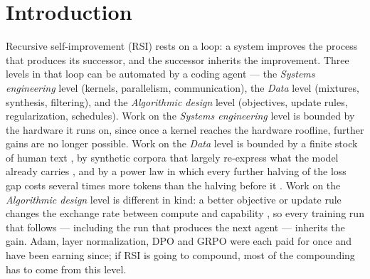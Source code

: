 \section{Introduction}
\label{sec:intro}

Recursive self-improvement (RSI) rests on a loop: a system improves the process that produces its successor, and the successor inherits the improvement. 
Three levels in that loop can be automated by a coding agent --- the \emph{Systems engineering} level (kernels, parallelism, communication), the \emph{Data} level (mixtures, synthesis, filtering), and the \emph{Algorithmic design} level (objectives, update rules, regularization,
schedules). 
Work on the \emph{Systems engineering} level is bounded by the hardware it runs on, since once a kernel reaches the hardware roofline, further gains are no longer possible.
Work on the \emph{Data} level is bounded by a finite stock of human text \citep{villalobos2022rundata}, by synthetic corpora that
largely re-express what the model already carries \citep{shumailov2023curse}, and by a power law in which every further halving of the loss gap costs several times more tokens than the halving before it \citep{kaplan2020scaling,hoffmann2022chinchilla}. 
Work on the \emph{Algorithmic design} level is different in kind: a better objective or update rule changes the exchange rate between compute and capability \citep{ho2024algprogress}, so every training run that follows --- including the run that produces the next agent --- inherits the gain. Adam, layer normalization, DPO and GRPO were each paid for once and have been earning since; if RSI is going to compound, most of the compounding has to come from this level.

